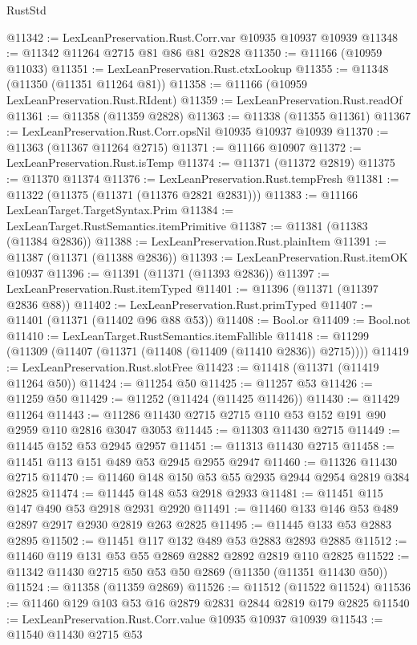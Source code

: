 \begin{lexlean}{RustStd}
\begin{coremodule}
{\begin{coremodule}
{{{{{{{{{{{{{{{{{{{{{{{{{{{{{{{{{@11342 := LexLeanPreservation.Rust.Corr.var @10935 @10937 @10939
@11348 := @11342 @11264 @2715 @81 @86 @81 @2828
@11350 := @11166 (@10959 @11033)
@11351 := LexLeanPreservation.Rust.ctxLookup
@11355 := @11348 (@11350 (@11351 @11264 @81))
@11358 := @11166 (@10959 LexLeanPreservation.Rust.RIdent)
@11359 := LexLeanPreservation.Rust.readOf
@11361 := @11358 (@11359 @2828)
@11363 := @11338 (@11355 @11361)
@11367 := LexLeanPreservation.Rust.Corr.opsNil @10935 @10937 @10939
@11370 := @11363 (@11367 @11264 @2715)
@11371 := @11166 @10907
@11372 := LexLeanPreservation.Rust.isTemp
@11374 := @11371 (@11372 @2819)
@11375 := @11370 @11374
@11376 := LexLeanPreservation.Rust.tempFresh
@11381 := @11322 (@11375 (@11371 (@11376 @2821 @2831)))
@11383 := @11166 LexLeanTarget.TargetSyntax.Prim
@11384 := LexLeanTarget.RustSemantics.itemPrimitive
@11387 := @11381 (@11383 (@11384 @2836))
@11388 := LexLeanPreservation.Rust.plainItem
@11391 := @11387 (@11371 (@11388 @2836))
@11393 := LexLeanPreservation.Rust.itemOK @10937
@11396 := @11391 (@11371 (@11393 @2836))
@11397 := LexLeanPreservation.Rust.itemTyped
@11401 := @11396 (@11371 (@11397 @2836 @88))
@11402 := LexLeanPreservation.Rust.primTyped
@11407 := @11401 (@11371 (@11402 @96 @88 @53))
@11408 := Bool.or
@11409 := Bool.not
@11410 := LexLeanTarget.RustSemantics.itemFallible
@11418 := @11299 (@11309 (@11407 (@11371 (@11408 (@11409 (@11410 @2836)) @2715))))
@11419 := LexLeanPreservation.Rust.slotFree
@11423 := @11418 (@11371 (@11419 @11264 @50))
@11424 := @11254 @50
@11425 := @11257 @53
@11426 := @11259 @50
@11429 := @11252 (@11424 (@11425 @11426))
@11430 := @11429 @11264
@11443 := @11286 @11430 @2715 @2715 @110 @53 @152 @191 @90 @2959 @110 @2816 @3047 @3053
@11445 := @11303 @11430 @2715
@11449 := @11445 @152 @53 @2945 @2957
@11451 := @11313 @11430 @2715
@11458 := @11451 @113 @151 @489 @53 @2945 @2955 @2947
@11460 := @11326 @11430 @2715
@11470 := @11460 @148 @150 @53 @55 @2935 @2944 @2954 @2819 @384 @2825
@11474 := @11445 @148 @53 @2918 @2933
@11481 := @11451 @115 @147 @490 @53 @2918 @2931 @2920
@11491 := @11460 @133 @146 @53 @489 @2897 @2917 @2930 @2819 @263 @2825
@11495 := @11445 @133 @53 @2883 @2895
@11502 := @11451 @117 @132 @489 @53 @2883 @2893 @2885
@11512 := @11460 @119 @131 @53 @55 @2869 @2882 @2892 @2819 @110 @2825
@11522 := @11342 @11430 @2715 @50 @53 @50 @2869 (@11350 (@11351 @11430 @50))
@11524 := @11358 (@11359 @2869)
@11526 := @11512 (@11522 @11524)
@11536 := @11460 @129 @103 @53 @16 @2879 @2831 @2844 @2819 @179 @2825
@11540 := LexLeanPreservation.Rust.Corr.value @10935 @10937 @10939
@11543 := @11540 @11430 @2715 @53
}}}}}}}}}}}}}}}}}}}}}}}}}}}}}}}}}
\end{coremodule}}
\end{coremodule}
\end{lexlean}
